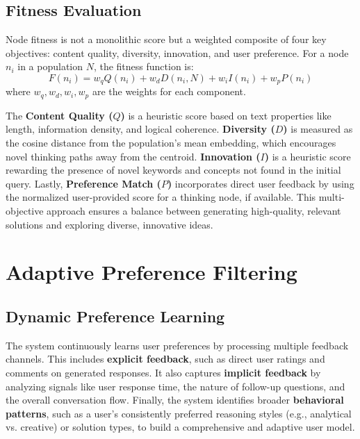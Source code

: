 \documentclass[letterpaper]{article} %
\begin{document}
\subsection{Fitness Evaluation}

Node fitness is not a monolithic score but a weighted composite of four key objectives: content quality, diversity, innovation, and user preference. For a node $n_i$ in a population $N$, the fitness function is:
\begin{equation}
\label{eq:fitness}
F(n_i) = w_q Q(n_i) + w_d D(n_i, N) + w_i I(n_i) + w_p P(n_i)
\end{equation}
where $w_q, w_d, w_i, w_p$ are the weights for each component.

The {\bfseries Content Quality ($Q$)} is a heuristic score based on text properties like length, information density, and logical coherence. {\bfseries Diversity ($D$)} is measured as the cosine distance from the population's mean embedding, which encourages novel thinking paths away from the centroid. {\bfseries Innovation ($I$)} is a heuristic score rewarding the presence of novel keywords and concepts not found in the initial query. Lastly, {\bfseries Preference Match ($P$)} incorporates direct user feedback by using the normalized user-provided score for a thinking node, if available. This multi-objective approach ensures a balance between generating high-quality, relevant solutions and exploring diverse, innovative ideas.

\section{Adaptive Preference Filtering}

\subsection{Dynamic Preference Learning}

The system continuously learns user preferences by processing multiple feedback channels. This includes {\bfseries explicit feedback}, such as direct user ratings and comments on generated responses. It also captures {\bfseries implicit feedback} by analyzing signals like user response time, the nature of follow-up questions, and the overall conversation flow. Finally, the system identifies broader {\bfseries behavioral patterns}, such as a user's consistently preferred reasoning styles (e.g., analytical vs. creative) or solution types, to build a comprehensive and adaptive user model.
\end{document}

